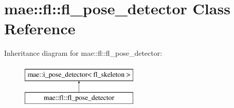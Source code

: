 \hypertarget{classmae_1_1fl_1_1fl__pose__detector}{\section{mae\-:\-:fl\-:\-:fl\-\_\-pose\-\_\-detector Class Reference}
\label{classmae_1_1fl_1_1fl__pose__detector}
}
Inheritance diagram for mae\-:\-:fl\-:\-:fl\-\_\-pose\-\_\-detector\-:\begin{figure}[H]
\begin{center}
\leavevmode
\includegraphics[height=2.000000cm]{classmae_1_1fl_1_1fl__pose__detector}
\end{center}
\end{figure}
